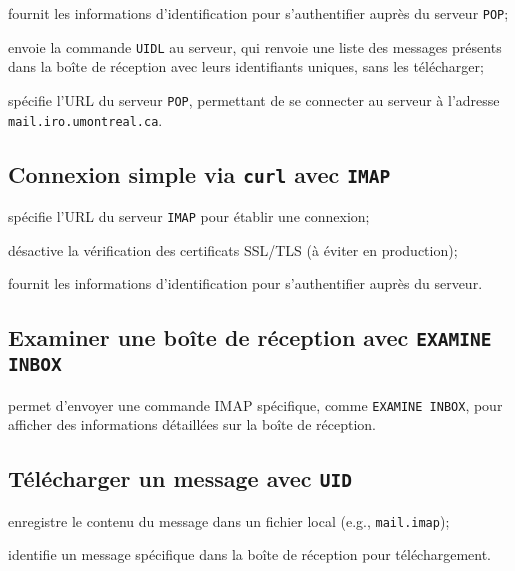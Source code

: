 \documentclass[a4paper]{report}
\begin{document}
\noindent{} 
    fournit les informations d'identification  
    pour s'authentifier auprès du serveur \texttt{POP};  

\noindent{} 
    envoie la commande \texttt{UIDL} au serveur, 
    qui renvoie une liste des messages présents dans la boîte de réception 
    avec leurs identifiants uniques, sans les télécharger;  

\noindent{} 
    spécifie l'URL du serveur \texttt{POP}, permettant de 
    se connecter au serveur à l'adresse \texttt{mail.iro.umontreal.ca}.  

\subsection{Connexion simple via \texttt{curl} avec \texttt{IMAP}}
    spécifie l'URL du serveur \texttt{IMAP} pour établir une connexion;

\noindent{} 
    désactive la vérification des certificats SSL/TLS (à éviter en production);

\noindent{} 
    fournit les informations d'identification pour s'authentifier 
    auprès du serveur.

\subsection{Examiner une boîte de réception avec \texttt{EXAMINE INBOX}}
\noindent{} 
    permet d'envoyer une commande IMAP spécifique, comme 
    \texttt{EXAMINE INBOX}, pour afficher des informations détaillées 
    sur la boîte de réception.

\subsection{Télécharger un message avec \texttt{UID}}
    enregistre le contenu du message dans un fichier local (e.g., 
    \texttt{mail.imap});

\noindent{} 
    identifie un message spécifique dans la boîte de réception pour 
    téléchargement.
\end{document}
